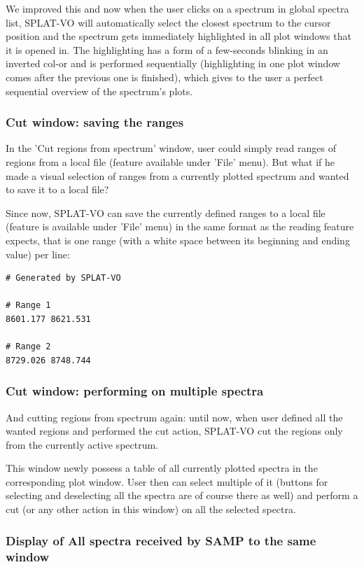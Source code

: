 \documentclass[final,authoryear,5p,times,twocolumn]{elsarticle}
\begin{document}
We improved this and now when the user clicks on a spectrum in global spectra
list, SPLAT-VO will automatically select the closest spectrum to the cursor
position and  the spectrum gets immediately highlighted in all plot windows
that it is opened in. The highlighting has a form of a few-seconds blinking in
an inverted col-or and is performed sequentially (highlighting in one plot
window comes after the previous one is finished), which gives to the user a
perfect sequential overview of the spectrum's plots.

\subsubsection{Cut window: saving the ranges}

In the 'Cut regions from spectrum' window, user could simply read
ranges of regions from a local file (feature available under 'File'
menu). But what if he made a visual selection of ranges from a
currently plotted spectrum and wanted to save it to a local file?

Since now, SPLAT-VO can save the currently defined
ranges to a local file (feature is available under 'File' menu) in the
same format as the reading feature expects, that is one range (with a
white space between its beginning and ending value) per line:

\begin{verbatim}
# Generated by SPLAT-VO

# Range 1
8601.177 8621.531

# Range 2
8729.026 8748.744
\end{verbatim}

\subsubsection{Cut window: performing on multiple spectra}

And cutting regions from spectrum again: until now, when user defined
all the wanted regions and performed the cut action, SPLAT-VO cut the
regions only from the currently active spectrum.

This window newly possess a table of all
currently plotted spectra in the corresponding plot window. User then
can select multiple of it (buttons for selecting and deselecting all
the spectra are of course there as well) and perform a cut (or any
other action in this window) on all the selected spectra.

\subsubsection{Display of All  spectra received by SAMP to the same  window}
\end{document}
